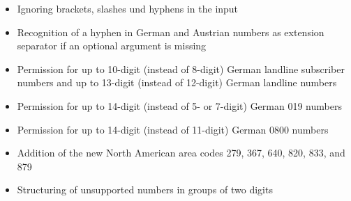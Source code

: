 \documentclass[numbers=noenddot]{scrreprt}
\begin{document}
\begin{description}
\begin{itemize}
\item Ignoring brackets, slashes und hyphens in the input
\item Recognition of a hyphen in German and Austrian numbers as extension separator if an optional argument is missing
\item Permission for up to 10-digit (instead of 8-digit) German landline subscriber numbers and up to 13-digit (instead of 12-digit) German landline numbers
\item Permission for up to 14-digit (instead of 5- or 7-digit) German 019 numbers
\item Permission for up to 14-digit (instead of 11-digit) German 0800 numbers
\item Addition of the new North American area codes 279, 367, 640, 820, 833, and 879
\item Structuring of unsupported numbers in groups of two digits
\end{itemize}

\end{description}
\end{document}
